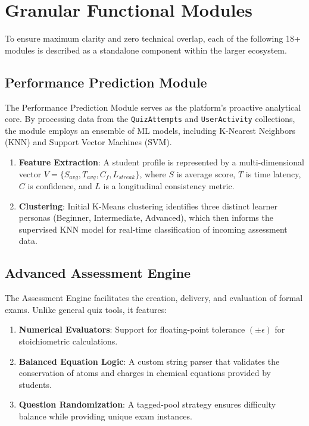 \documentclass[10pt, conference]{IEEEtran}
\begin{document}
\section{Granular Functional Modules}

To ensure maximum clarity and zero technical overlap, each of the following 18+ modules is described as a standalone component within the larger ecosystem.

\subsection{Performance Prediction Module}
The Performance Prediction Module serves as the platform's proactive analytical core. By processing data from the \texttt{QuizAttempts} and \texttt{UserActivity} collections, the module employs an ensemble of ML models, including K-Nearest Neighbors (KNN) and Support Vector Machines (SVM).
\begin{enumerate}
    \item \textbf{Feature Extraction}: A student profile is represented by a multi-dimensional vector $V = \{S_{avg}, T_{avg}, C_{f}, L_{streak}\}$, where $S$ is average score, $T$ is time latency, $C$ is confidence, and $L$ is a longitudinal consistency metric.
    \item \textbf{Clustering}: Initial K-Means clustering identifies three distinct learner personas (Beginner, Intermediate, Advanced), which then informs the supervised KNN model for real-time classification of incoming assessment data.
\end{enumerate}

\subsection{Advanced Assessment Engine}
The Assessment Engine facilitates the creation, delivery, and evaluation of formal exams. Unlike general quiz tools, it features:
\begin{enumerate}
    \item \textbf{Numerical Evaluators}: Support for floating-point tolerance $(\pm\epsilon)$ for stoichiometric calculations.
    \item \textbf{Balanced Equation Logic}: A custom string parser that validates the conservation of atoms and charges in chemical equations provided by students.
    \item \textbf{Question Randomization}: A tagged-pool strategy ensures difficulty balance while providing unique exam instances.
\end{enumerate}
\end{document}

